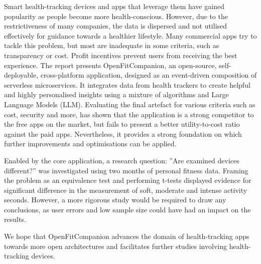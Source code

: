 %
{\singlespacing
Smart health-tracking devices and apps that leverage them have gained popularity as people become more health-conscious. However, due to the restrictiveness of many companies, the data is dispersed and not utilised effectively for guidance towards a healthier lifestyle. Many commercial apps try to tackle this problem, but most are inadequate in some criteria, such as transparency or cost. Profit incentives prevent users from receiving the best experience. The report presents OpenFitCompanion, an open-source, self-deployable, cross-platform application, designed as an event-driven composition of serverless microservices. It integrates data from health trackers to create helpful and highly personalised insights using a mixture of algorithms and Large Language Models (LLM). Evaluating the final artefact for various criteria such as cost, security and more, has shown that the application is a strong competitor to the free apps on the market, but fails to present a better utility-to-cost ratio against the paid apps. Nevertheless, it provides a strong foundation on which further improvements and optimisations can be applied. 

Enabled by the core application, a research question: ”Are examined devices different?” was investigated using two months of personal fitness data. Framing the problem as an equivalence test and performing t-tests displayed evidence for significant difference in the measurement of soft, moderate and intense activity seconds. However, a more rigorous study would be required to draw any conclusions, as user errors and low sample size could have had an impact on the results. 

We hope that OpenFitCompanion advances the domain of health-tracking apps towards more open architectures and facilitates further studies involving health-tracking devices. 
}

